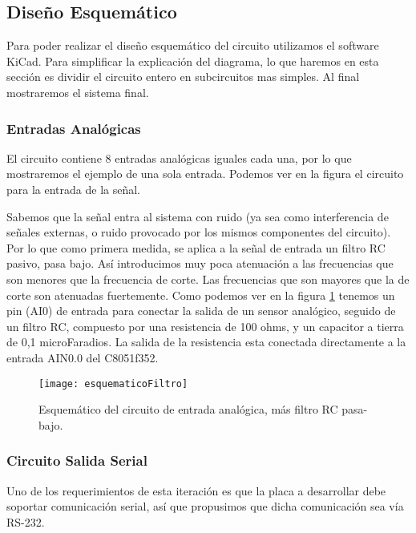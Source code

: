 \subsection{Diseño Esquemático}
\label{diseno_esquematico}

Para poder realizar el diseño esquemático del circuito utilizamos el software KiCad. Para simplificar la explicación del diagrama, lo que haremos en esta sección es dividir el circuito entero en subcircuitos mas simples. Al final mostraremos el sistema final.

\subsubsection{Entradas Analógicas}
\label{entradas_analogicas}

El circuito contiene 8 entradas analógicas iguales cada una, por lo que mostraremos el ejemplo de una sola entrada. Podemos ver en la figura  el circuito para la entrada de la señal. 

Sabemos que la señal entra al sistema con ruido (ya sea como interferencia de señales externas, o ruido provocado por los mismos componentes del circuito). Por lo que como primera medida, se aplica a la señal de entrada un filtro RC pasivo, pasa bajo. Así introducimos muy poca atenuación a las frecuencias que son menores que la frecuencia de corte. Las frecuencias que son mayores que la de corte son atenuadas fuertemente. 
Como podemos ver en la figura \ref{fig:esquematicoFiltro} tenemos un pin (AI0) de entrada para conectar la salida de un sensor analógico, seguido de un filtro RC, compuesto por una resistencia de 100 ohms, y un capacitor a tierra de 0,1 microFaradios. La salida de la resistencia esta conectada directamente a la entrada AIN0.0 del C8051f352.

\begin{figure}[h]
  \centering
  \texttt{[image: esquematicoFiltro]}
  \caption{Esquemático del circuito de entrada analógica, más filtro RC pasa-bajo.}\label{fig:esquematicoFiltro}
\end{figure}


\subsubsection{Circuito Salida Serial}
\label{salida_serial}

Uno de los requerimientos de esta iteración es que la placa a desarrollar debe soportar comunicación serial, así que propusimos que dicha comunicación sea vía RS-232.

